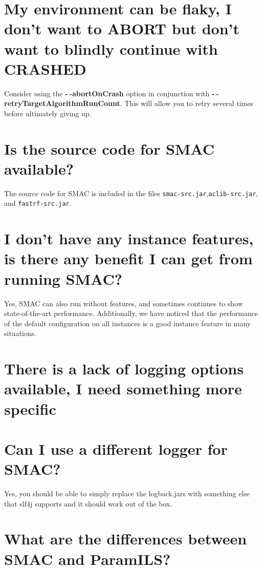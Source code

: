 \documentclass[11pt,letterpaper,oneside]{article}
\begin{document}
\section{My environment can be flaky, I don't want to ABORT but don't want to blindly continue with CRASHED}

	Consider using the \textbf{-$~\!$-abortOnCrash} option in conjunction with \textbf{-$~\!$-retryTargetAlgorithmRunCount}. This will allow you to retry several times before ultimately giving up.

\section{Is the source code for SMAC available?}

	The source code for SMAC is included in the files \texttt{smac-src.jar},\texttt{aclib-src.jar}, and \texttt{fastrf-src.jar}.

\section{I don't have any instance features, is there any benefit I can get from running SMAC?}

	Yes, SMAC can also run without features, and sometimes continues to show state-of-the-art performance. Additionally, we have noticed that the performance of the default configuration on all instances is a good instance feature in many situations.
	
\section{There is a lack of logging options available, I need something more specific}
\label{sec:alternative-logging}
	

	

\section{Can I use a different logger for SMAC?}

	Yes, you should be able to simply replace the logback.jars with something else that slf4j supports and it should work out of the box. 

\section{What are the differences between SMAC and ParamILS?}
\end{document}
